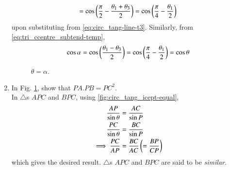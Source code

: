 \begin{enumerate}[label=\thesubsection.\arabic*.,ref=\thesubsection.\theenumi]
\begin{align}
	    =\cos\left(\frac{\pi}{2}-\frac{\theta_1+\theta_3}{2}\right)
	    =\cos\left(\frac{\pi}{4}-\frac{\theta_1}{2}\right)
  \end{align}
  upon substituting from 
		\eqref{eq:circ_tang-line-t3}.  Similarly, 	
		from
\eqref{eq:tri_ccentre_subtend-temp},
  \begin{align}
	  \cos \alpha = \cos \left(\frac{\theta_1-\theta_3}{2}  \right)
	    =\cos\left(\frac{\pi}{4}-\frac{\theta_1}{2}\right)
	  =\cos \theta
  \end{align}
%
	\begin{figure}[!ht]
		\begin{center}
			
			\resizebox{0.6\columnwidth}{!}{}
		\end{center}
		\caption{$\theta= \alpha$.}
		\label{fig:circ_tang_icept}	
	\end{figure}
\item
	In Fig. \ref{fig:circ_tang_icept}, show that $PA.PB = PC^2$.
\label{them:circ_tang_icept_prod}	
\\
\solution 
In $\triangle$s $APC$ and $BPC$, 
using
		\eqref{fig:circ_tang_icept-equal},	
  \begin{align}
	  \frac{AP}{\sin \theta} &= \frac{AC}{\sin P} 
	  \\
	  \frac{PC}{\sin \theta} &= \frac{BC}{\sin P} 
	  \\
	  \implies \frac{PC}{AP} &= \frac{BC}{AC}  \left(= \frac{BP}{CP}\right)
  \end{align}
  which gives the desired result.
$\triangle$s $APC$ and $BPC$ are said to be {\em similar}.
\end{enumerate}
%
